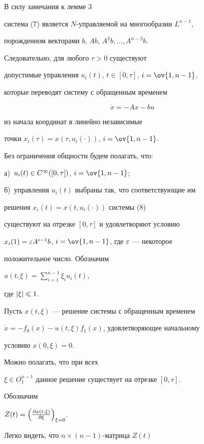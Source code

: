 \begin{pf}


В силу замечания к лемме 3


система (7) является $N$-управляемой на многообразии $L^{n-1}$,


порожденном векторами $b$, $Ab$, $A^2b,\dotsc,A^{n-2}b$.


Следовательно, для любого $\tau>0$ существуют


допустимые управления $u_i(t)$, $t\in[0,\tau]$, $i=\ov{1,n-1}$,


которые переводят систему с обращенным временем


\begin{equation}


\Dot x = -Ax - bu


\end{equation}


из начала координат в линейно независимые


точки $x_i(\tau)=x(\tau,u_i(\cdot))$, $i=\ov{1,n-1}$.


Без ограничения общности будем полагать, что:


а)~$u_i(t)\in C^{\infty}([0,\tau])$, $i=\ov{1,n-1}$;


б)~управления $u_i(t)$ выбраны так, что соответствующие им


решения $x_i(t)=x(t,u_i(\cdot))$ системы (8)


существуют на отрезке $[0,\tau]$ и удовлетворяют условию


$x_i(1)=\varepsilon A^{i-1}b$, $i=\ov{1,n-1}$, где $\varepsilon$ --- некоторое


положительное число. Обозначим


$u(t,\xi)=\sum\limits_{i=1}^{n-1}\xi_i u_i(t)$,


где $|\xi|\leqslant 1$.





Пусть $x(t,\xi)$ --- решение системы с обращенным временем


$\Dot x = -f_0(x) - u(t,\xi)f_1(x)$, удовлетворяющее начальному


условию  $x(0,\xi) = 0$.


Можно полагать, что при всех


$\xi\in O^{n-1}_1$ данное решение существует на отрезке $[0,\tau]$.


Обозначим


$Z(t)=\left(\frac{\partial x(t,\xi)}{\partial\xi}\right)_{\xi=0}$.


Легко видеть, что $n\times(n-1)$-матрица $Z(t)$



\end{pf}
